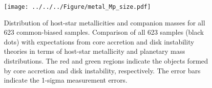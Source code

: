 \documentclass[twocolumn, dvipdfmx]{aastex62}
\begin{document}
\begin{CJK*}{UTF8}{min}
\begin{figure}[t]
\begin{center}
\texttt{[image: ../../../Figure/metal\_Mp\_size.pdf]}
\caption{Distribution of host-star metallicities and companion masses for all 623 common-biased samples. Comparison of all 623 samples (black dots) with expectations from core accretion and disk instability theories in terms of host-star metallicity and planetary mass distributions. The red and green regions indicate the objects formed by core accretion and disk instability, respectively. The error bars indicate the 1-sigma measurement errors.
 \label{fig:metal_Mp}}
\end{center}
\end{figure}


\clearpage


\begin{thebibliography}{}


\end{thebibliography}
\end{CJK*}
\end{document}
